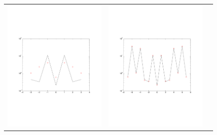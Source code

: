 \begin{figure}[htpb]
\begin{tabular}{ccc}
  \includegraphics[scale=0.25]{figs/tracAliasingUp4N08} &
  \includegraphics[scale=0.25]{figs/tracAliasingUp4N16} &

\end{tabular}
\end{figure}
